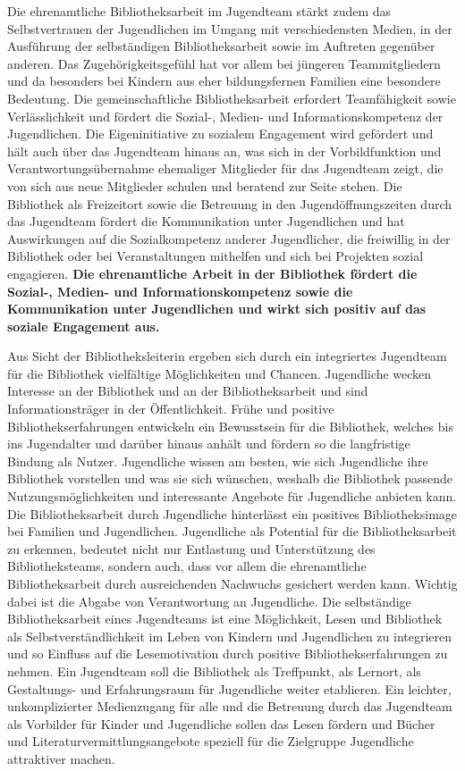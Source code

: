 \documentclass[a4paper,
fontsize=11pt,
oneside,
numbers=noperiodatend,
parskip=half-,
bibliography=totoc,
final
]{scrartcl}
\begin{document}
Die ehrenamtliche Bibliotheksarbeit im Jugendteam stärkt zudem das
Selbstvertrauen der Jugendlichen im Umgang mit verschiedensten Medien,
in der Ausführung der selbständigen Bibliotheksarbeit sowie im Auftreten
gegenüber anderen. Das Zugehörigkeitsgefühl hat vor allem bei jüngeren
Teammitgliedern und da besonders bei Kindern aus eher bildungsfernen
Familien eine besondere Bedeutung. Die gemeinschaftliche
Bibliotheksarbeit erfordert Teamfähigkeit sowie Verlässlichkeit und
fördert die Sozial-, Medien- und Informationskompetenz der Jugendlichen.
Die Eigeninitiative zu sozialem Engagement wird gefördert und hält auch
über das Jugendteam hinaus an, was sich in der Vorbildfunktion und
Verantwortungsübernahme ehemaliger Mitglieder für das Jugendteam zeigt,
die von sich aus neue Mitglieder schulen und beratend zur Seite stehen.
Die Bibliothek als Freizeitort sowie die Betreuung in den
Jugendöffnungszeiten durch das Jugendteam fördert die Kommunikation
unter Jugendlichen und hat Auswirkungen auf die Sozialkompetenz anderer
Jugendlicher, die freiwillig in der Bibliothek oder bei Veranstaltungen
mithelfen und sich bei Projekten sozial engagieren. \textbf{Die
ehrenamtliche Arbeit in der Bibliothek fördert die Sozial-, Medien- und
Informationskompetenz sowie die Kommunikation unter Jugendlichen und
wirkt sich positiv auf das soziale Engagement aus.}

Aus Sicht der Bibliotheksleiterin ergeben sich durch ein integriertes
Jugendteam für die Bibliothek vielfältige Möglichkeiten und Chancen.
Jugendliche wecken Interesse an der Bibliothek und an der
Bibliotheksarbeit und sind Informationsträger in der Öffentlichkeit.
Frühe und positive Bibliothekserfahrungen entwickeln ein Bewusstsein für
die Bibliothek, welches bis ins Jugendalter und darüber hinaus anhält
und fördern so die langfristige Bindung als Nutzer. Jugendliche wissen
am besten, wie sich Jugendliche ihre Bibliothek vorstellen und was sie
sich wünschen, weshalb die Bibliothek passende Nutzungsmöglichkeiten und
interessante Angebote für Jugendliche anbieten kann. Die
Bibliotheksarbeit durch Jugendliche hinterlässt ein positives
Bibliotheksimage bei Familien und Jugendlichen. Jugendliche als
Potential für die Bibliotheksarbeit zu erkennen, bedeutet nicht nur
Entlastung und Unterstützung des Bibliotheksteams, sondern auch, dass
vor allem die ehrenamtliche Bibliotheksarbeit durch ausreichenden
Nachwuchs gesichert werden kann. Wichtig dabei ist die Abgabe von
Verantwortung an Jugendliche. Die selbständige Bibliotheksarbeit eines
Jugendteams ist eine Möglichkeit, Lesen und Bibliothek als
Selbstverständlichkeit im Leben von Kindern und Jugendlichen zu
integrieren und so Einfluss auf die Lesemotivation durch positive
Bibliothekserfahrungen zu nehmen. Ein Jugendteam soll die Bibliothek als
Treffpunkt, als Lernort, als Gestaltungs- und Erfahrungsraum für
Jugendliche weiter etablieren. Ein leichter, unkomplizierter
Medienzugang für alle und die Betreuung durch das Jugendteam als
Vorbilder für Kinder und Jugendliche sollen das Lesen fördern und Bücher
und Literaturvermittlungsangebote speziell für die Zielgruppe
Jugendliche attraktiver machen.
\end{document}
